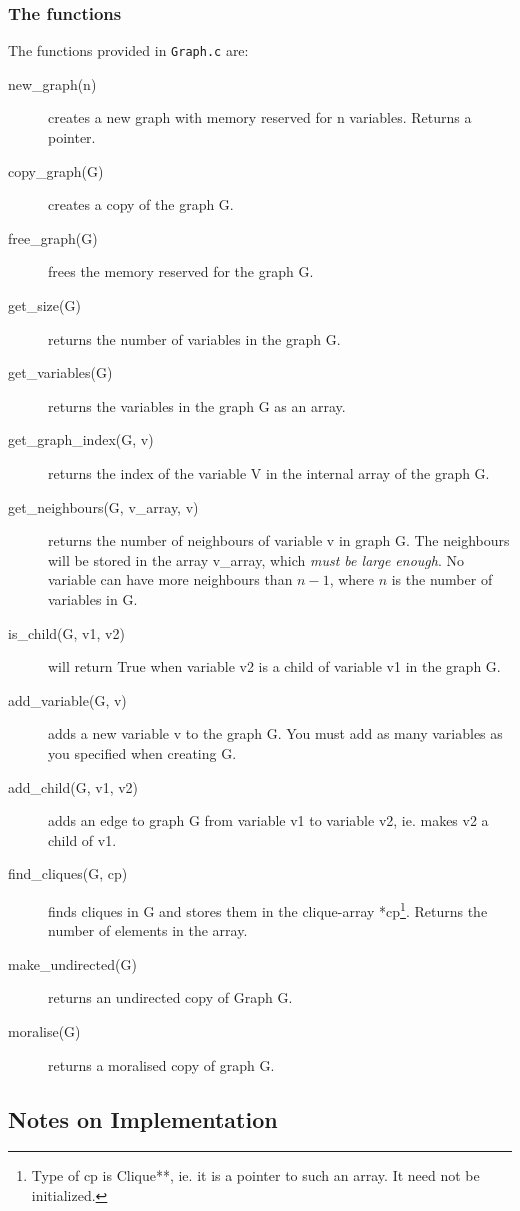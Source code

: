 \documentclass[12pt,a4paper]{report}
\begin{document}
\subsubsection{The functions}

The functions provided in \verb+Graph.c+ are:

\begin{description}
\item[new\_graph(n)] creates a new graph with memory reserved for n
variables. Returns a pointer.
\item[copy\_graph(G)] creates a copy of the graph G.
\item[free\_graph(G)] frees the memory reserved for the graph G.
\item[get\_size(G)] returns the number of variables in the graph G.
\item[get\_variables(G)] returns the variables in the graph G as an array.
\item[get\_graph\_index(G, v)] returns the index of the
variable V in the internal array of the graph G.
\item[get\_neighbours(G, v\_array, v)] returns the number of neighbours
of variable v in graph G. The neighbours will be stored in the array
v\_array, which {\it must be large enough}. No variable can have more
neighbours than $n-1$, where $n$ is the number of variables in G.
\item[is\_child(G, v1, v2)] will return True when variable v2 is a
child of variable v1 in the graph G.
\item[add\_variable(G, v)] adds a new variable v to the graph G. You
must add as many variables as you specified when creating G.
\item[add\_child(G, v1, v2)] adds an edge to graph G from variable v1
to variable v2, ie. makes v2 a child of v1.
\item[find\_cliques(G, cp)] finds cliques in G and stores them
in the clique-array *cp\footnote{Type of cp is Clique**, ie. it is a
pointer to such an array. It need not be initialized.}. Returns the
number of elements in the array.
\item[make\_undirected(G)] returns an undirected copy of Graph G.
\item[moralise(G)] returns a moralised copy of graph G.

\end{description}

\subsection{Notes on Implementation}
\end{document}
